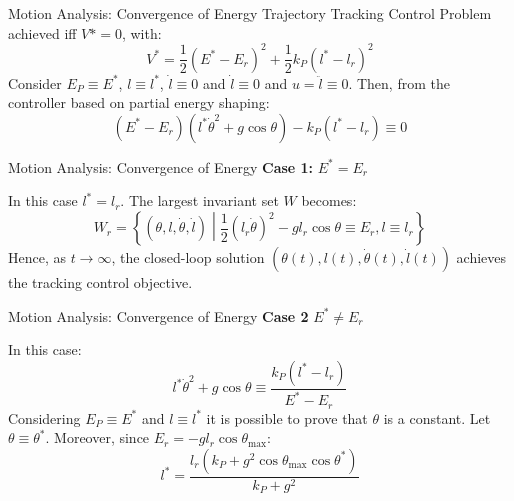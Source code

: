 \documentclass[10pt]{beamer}
\begin{document}
  \begin{frame}{Motion Analysis: Convergence of Energy}
    Trajectory Tracking Control Problem achieved iff $V*=0$, with:
		\begin{equation*}
			V^* = \frac{1}{2}(E^*-E_r)^2+\frac{1}{2}k_P(l^*-l_r)^2
		\end{equation*}
		Consider $E_P \equiv E^*$, $l \equiv l^*$, $\dot{l} \equiv 0$ and
    $\dot{l} \equiv 0$ and $u = \ddot{l} \equiv 0$. Then, from the controller
		based on partial energy shaping:
    \begin{equation*}
      (E^*-E_r)(l^*\dot{\theta}^2+g\cos\theta)-k_P(l^*-l_r) \equiv 0
    \end{equation*}
  \end{frame}

	\begin{frame}{Motion Analysis: Convergence of Energy}
		\noindent \textbf{Case 1:} $E^* = E_r$

    In this case $l^* = l_r$. The largest invariant set $W$ becomes:
    \begin{equation*}
      W_r = \left\{ (\theta, l, \dot{\theta}, \dot{l})
      	\middle| \frac{1}{2} (l_r \dot{\theta})^2 -
        g l_r \cos\theta \equiv E_r, l \equiv l_r \right\}
    \end{equation*}
    Hence, as $t \to \infty$, the closed-loop solution
    $(\theta(t), l(t), \dot{\theta}(t), \dot{l}(t))$ achieves the
    tracking control objective.
	\end{frame}

	\begin{frame}{Motion Analysis: Convergence of Energy}
    \noindent \textbf{Case 2} $E^* \neq E_r$

		In this case:
    \begin{equation*}
      l^* \dot{\theta}^2 + g\cos\theta \equiv \frac{k_P(l^*-l_r)}{E^*-E_r}
    \end{equation*}
		Considering $E_P \equiv E^*$ and $l \equiv l^*$ it is possible to prove
		that $\theta$ is a constant. Let $\theta \equiv \theta^*$. Moreover,
		since $E_r = -g l_r \cos\theta_{\max}$:
    \begin{equation*}
      l^* = \frac{l_r(k_P+g^2\cos\theta_{\max}\cos\theta^*)}{k_P+g^2}
    \end{equation*}
	\end{frame}
\end{document}
